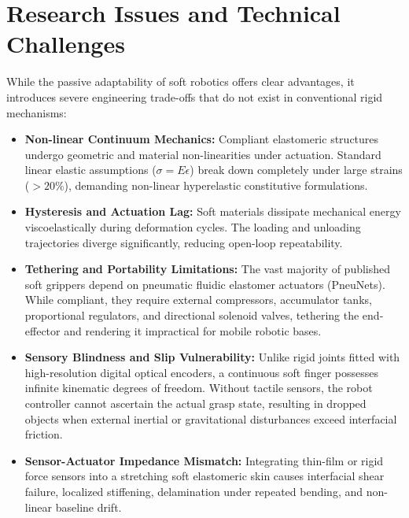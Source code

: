 \documentclass[12pt,a4paper]{report}
\begin{document}
\section{Research Issues and Technical Challenges}
While the passive adaptability of soft robotics offers clear advantages, it introduces severe engineering trade-offs that do not exist in conventional rigid mechanisms:
\begin{itemize}
    \item \textbf{Non-linear Continuum Mechanics:} Compliant elastomeric structures undergo geometric and material non-linearities under actuation. Standard linear elastic assumptions ($\sigma = E \epsilon$) break down completely under large strains ($>20\%$), demanding non-linear hyperelastic constitutive formulations.
    \item \textbf{Hysteresis and Actuation Lag:} Soft materials dissipate mechanical energy viscoelastically during deformation cycles. The loading and unloading trajectories diverge significantly, reducing open-loop repeatability.
    \item \textbf{Tethering and Portability Limitations:} The vast majority of published soft grippers depend on pneumatic fluidic elastomer actuators (PneuNets). While compliant, they require external compressors, accumulator tanks, proportional regulators, and directional solenoid valves, tethering the end-effector and rendering it impractical for mobile robotic bases.
    \item \textbf{Sensory Blindness and Slip Vulnerability:} Unlike rigid joints fitted with high-resolution digital optical encoders, a continuous soft finger possesses infinite kinematic degrees of freedom. Without tactile sensors, the robot controller cannot ascertain the actual grasp state, resulting in dropped objects when external inertial or gravitational disturbances exceed interfacial friction.
    \item \textbf{Sensor-Actuator Impedance Mismatch:} Integrating thin-film or rigid force sensors into a stretching soft elastomeric skin causes interfacial shear failure, localized stiffening, delamination under repeated bending, and non-linear baseline drift.
\end{itemize}
\end{document}
